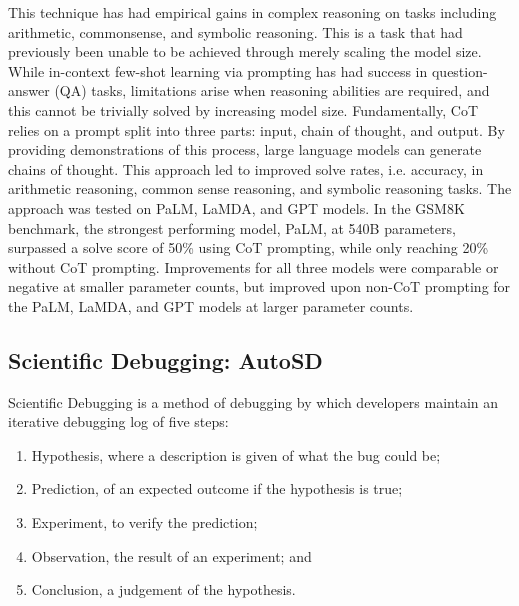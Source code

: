 \documentclass[letterpaper,12pt]{article}
\begin{document}
This technique has had empirical gains in complex reasoning on tasks including arithmetic, commonsense, and symbolic reasoning. This is a task that had previously been unable to be achieved through merely scaling the model size. While in-context few-shot learning via prompting has had success in question-answer (QA) tasks, limitations arise when reasoning abilities are required, and this cannot be trivially solved by increasing model size. Fundamentally, CoT relies on a prompt split into three parts: input, chain of thought, and output. By providing demonstrations of this process, large language models can generate chains of thought. This approach led to improved solve rates, i.e. accuracy, in arithmetic reasoning, common sense reasoning, and symbolic reasoning tasks. The approach was tested on PaLM, LaMDA, and GPT models. In the GSM8K benchmark, the strongest performing model, PaLM, at 540B parameters, surpassed a solve score of 50\% using CoT prompting, while only reaching 20\% without CoT prompting. Improvements for all three models were comparable or negative at smaller parameter counts, but improved upon non-CoT prompting for the PaLM, LaMDA, and GPT models at larger parameter counts.

\subsection{Scientific Debugging: AutoSD}

Scientific Debugging is a method of debugging by which developers maintain an iterative debugging log of five steps:

\begin{enumerate}
    \item Hypothesis, where a description is given of what the bug could be;
    \item Prediction, of an expected outcome if the hypothesis is true;
    \item Experiment, to verify the prediction;
    \item Observation, the result of an experiment; and
    \item Conclusion, a judgement of the hypothesis.
\end{enumerate}
\end{document}
